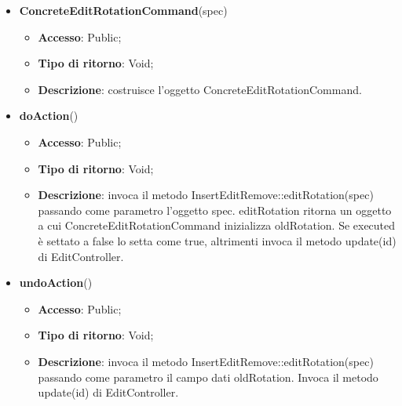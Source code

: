 {{{\begin{itemize}
\begin{itemize}
\begin{itemize}
\begin{itemize}
			\end{itemize}
		\end{itemize}
			\end{itemize}
			\end{itemize}
		\begin{itemize}
			\item \textbf{ConcreteEditRotationCommand}(spec)
			\begin{itemize}
				\item \textbf{Accesso}: Public;
				\item \textbf{Tipo di ritorno}: Void;
				\item \textbf{Descrizione}: costruisce l’oggetto ConcreteEditRotationCommand.
			\end{itemize}
			\item \textbf{doAction}()
			\begin{itemize}
				\item \textbf{Accesso}: Public;
				\item \textbf{Tipo di ritorno}: Void;
				\item \textbf{Descrizione}: invoca il metodo InsertEditRemove::editRotation(spec) passando come parametro l'oggetto spec. editRotation ritorna un oggetto a cui ConcreteEditRotationCommand inizializza oldRotation. Se executed è settato a false lo setta come true, altrimenti invoca il metodo update(id) di EditController.
			\end{itemize}
			\item \textbf{undoAction}()
			\begin{itemize}
				\item \textbf{Accesso}: Public;
				\item \textbf{Tipo di ritorno}: Void;
				\item \textbf{Descrizione}: invoca il metodo InsertEditRemove::editRotation(spec) passando come parametro il campo dati oldRotation. Invoca il metodo update(id) di EditController.
			\end{itemize}
		\end{itemize}
		}
}}
